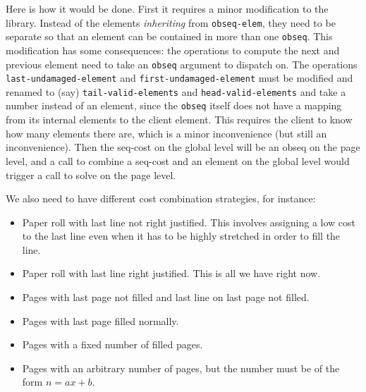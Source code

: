 Here is how it would be done.  First it requires a minor modification
to the {\obseq} library.  Instead of the elements \emph{inheriting}
from \texttt{obseq-elem}, they need to be separate so that an element
can be contained in more than one \texttt{obseq}.  This modification
has some consequences: the operations to compute the next and previous
element need to take an \texttt{obseq} argument to dispatch on.  The
operations \texttt{last-undamaged-element} and
\texttt{first-undamaged-element} must be modified and renamed to (say)
\texttt{tail-valid-elements} and \texttt{head-valid-elements} and take
a number instead of an element, since the \texttt{obseq} itself does
not have a mapping from its internal elements to the client element.
This requires the client to know how many elements there are, which is
a minor inconvenience (but still an inconvenience). Then the seq-cost
on the global level will be an obseq on the page level, and a call to
combine a seq-cost and an element on the global level would trigger a
call to solve on the page level.

We also need to have different cost combination strategies, for
instance:

\begin{itemize}
\item Paper roll with last line not right justified.  This involves
  assigning a low cost to the last line even when it has to be highly
  stretched in order to fill the line.  
\item Paper roll with last line right justified.  This is all we have
  right now.
\item Pages with last page not filled and last line on last page not
  filled. 
\item Pages with last page filled normally.
\item Pages with a fixed number of filled pages.
\item Pages with an arbitrary number of pages, but the number must be
  of the form $n = ax + b$.
\end{itemize}
